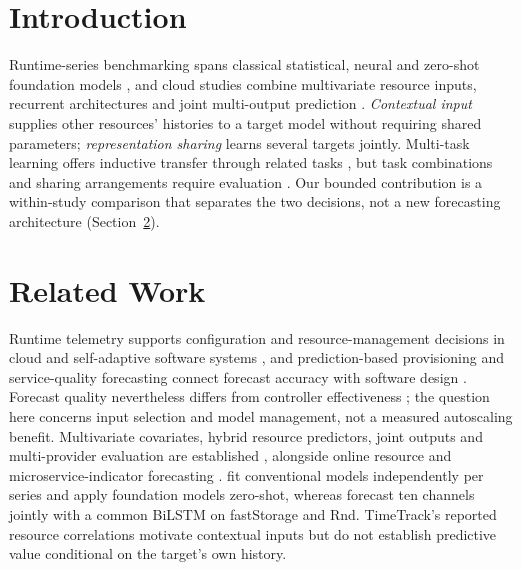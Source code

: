 \section{Introduction}
\label{sec:introduction}


Runtime-series benchmarking spans classical statistical, neural and zero-shot
foundation models \citep{DiMenna2026RuntimeForecasting}, and cloud studies
combine multivariate resource inputs, recurrent architectures and joint
multi-output prediction \citep{Ullah2023CloudBiLSTM,Tripathi2025MMRP}.
\emph{Contextual input} supplies other resources' histories to a target model
without requiring shared parameters; \emph{representation sharing} learns
several targets jointly. Multi-task learning offers inductive transfer through
related tasks \citep{Caruana1997Multitask}, but task combinations and sharing
arrangements require evaluation
\citep{Standley2020TaskGrouping,Fifty2021TaskGroupings,Nochumsohn2025MTLinear}.
Our bounded contribution is a within-study comparison that separates the two
decisions, not a new forecasting architecture (Section~\ref{sec:related-work}).


\section{Related Work}
\label{sec:related-work}

Runtime telemetry supports configuration and resource-management decisions in
cloud and self-adaptive software systems
\citep{Taherizadeh2018Monitoring,Bauer2020SelfAware}, and prediction-based
provisioning and service-quality forecasting connect forecast accuracy with
software design \citep{Calheiros2015ARIMA,Syu2017DynamicQoS}. Forecast quality
nevertheless differs from controller effectiveness \citep{Qu2018Autoscaling};
the question here concerns input selection and model management, not a
measured autoscaling benefit. Multivariate covariates, hybrid resource
predictors, joint outputs and multi-provider evaluation are established
\citep{Tran2018MultivariateFuzzy,Xu2022esDNN,Tripathi2025MMRP,
Rossi2025CloudUncertainty,Zhang2025SWTCLSTM}, alongside online resource and
microservice-indicator forecasting \citep{Gao2026OMCR,Gao2026MaMiClif}.
\citet{DiMenna2026RuntimeForecasting} fit conventional models independently
per series and apply foundation models zero-shot, whereas
\citet{Ullah2023CloudBiLSTM} forecast ten channels jointly with a common
BiLSTM on fastStorage and Rnd. TimeTrack's reported resource correlations
\citep{Meliani2025TimeTrack} motivate contextual inputs but do not establish
predictive value conditional on the target's own history.

